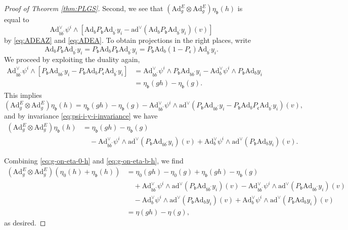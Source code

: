 \documentclass[10pt,a4paper]{amsart}
\newcommand{\Ad}{\mathrm{Ad}}
\newcommand{\ad}{\mathrm{ad}}
\newcommand{\fr}[1]{\mathfrak{#1}}
\newcommand{\ox}{\otimes}
\newcommand{\pr}{\prime}
\begin{document}
\begin{proof}[Proof of Theorem \ref{thm:PLGS}]
Second, we see that $\left( \Ad^{E}_g \ox \Ad^{E}_g \right) \eta_{\fr{b}}(h) $ is equal to
\[
\Ad^\vee_{b b^\pr} \psi^i \wedge \left[ \Ad_b P_{\fr{b}} \Ad_{b^\pr} y_i - \ad^\vee ( \Ad_b P_{\fr{b}} \Ad_{b^\pr} y_i ) (v) \right]
\]
by \eqref{eq:ADEAZ} and \eqref{eq:ADEA}.
To obtain projections in the right places, write
\[
\Ad_b P_{\fr{b}} \Ad_{b^\pr} y_i = P_{\fr{b}} \Ad_b P_{\fr{b}} \Ad_{b^\pr} y_i = P_{\fr{b}} \Ad_b \mathopen{} \left( 1 - P_{\fr{c}} \right) \Ad_{b^\pr} y_i .
\]
We proceed by exploiting the duality again,
\[
\begin{split}
\Ad^\vee_{b b^\pr} \psi^i \wedge \left[ P_{\fr{b}} \Ad_{b b^\pr} y_i - P_{\fr{b}} \Ad_b P_{\fr{c}} \Ad_{b^\pr} y_i \right] &= \Ad^\vee_{b b^\pr} \psi^i \wedge P_{\fr{b}} \Ad_{b b^\pr} y_i - \Ad^\vee_b \psi^i \wedge P_{\fr{b}} \Ad_b y_i \\
&= \eta_{\fr{b}}(g h) - \eta_{\fr{b}}(g) .
\end{split}
\]
This implies
\[
\left( \Ad^{E}_g \ox \Ad^{E}_g \right) \eta_{\fr{b}}(h) = \eta_{\fr{b}}(g h) - \eta_{\fr{b}}(g) - \Ad^\vee_{b b^\pr} \psi^i \wedge \ad^\vee ( P_{\fr{b}} \Ad_{b b^\pr} y_i - P_{\fr{b}} \Ad_b P_{\fr{c}} \Ad_{b^\pr} y_i ) (v),
\]
and by invariance \eqref{eq:psi-i-y-i-invariance} we have
\begin{equation}\label{eq:g-on-eta-b-h}
\begin{split}
\left( \Ad^{E}_g \ox \Ad^{E}_g \right) \eta_{\fr{b}}(h)
&= \eta_{\fr{b}}(g h) - \eta_{\fr{b}}(g) \\
&\quad - \Ad^\vee_{b b^\pr} \psi^i \wedge \ad^\vee ( P_{\fr{b}} \Ad_{b b^\pr} y_i ) (v) + \Ad^\vee_b \psi^i \wedge \ad^\vee ( P_{\fr{b}} \Ad_b y_i ) (v) .
\end{split}
\end{equation}

Combining \eqref{eq:g-on-eta-0-h} and \eqref{eq:g-on-eta-b-h}, we find
\[
\begin{split}
\left( \Ad^{E}_g \ox \Ad^{E}_g \right) \left( \eta_0(h) + \eta_{\fr{b}}(h) \right) &= \eta_0(g h) - \eta_0(g) + \eta_{\fr{b}}(g h) - \eta_{\fr{b}}(g)\\
&\quad  + \Ad^\vee_{b b^\pr} \psi^i \wedge \ad^\vee ( P_{\fr{b}} \Ad_{b b^\pr} y_i ) (v)- \Ad^\vee_{b b^\pr} \psi^i \wedge \ad^\vee ( P_{\fr{b}} \Ad_{b b^\pr} y_i ) (v) \\
&\quad- \Ad^\vee_b \psi^i \wedge \ad^\vee ( P_{\fr{b}} \Ad_b y_i ) (v) + \Ad^\vee_b \psi^i \wedge \ad^\vee ( P_{\fr{b}} \Ad_b y_i ) (v) \\
&= \eta(g h) - \eta(g) ,
\end{split}
\]
as desired.
\end{proof}
\end{document}
